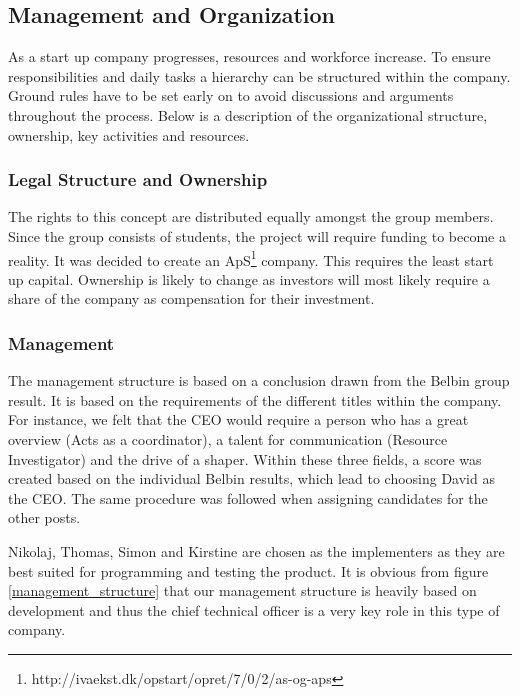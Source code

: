 \subsection{Management and Organization}
\label{sec:managementOrganization}
As a start up company progresses, resources and workforce increase. To ensure responsibilities and daily tasks a hierarchy can be structured within the company. Ground rules have to be set early on to avoid discussions and arguments throughout the process. Below is a description of the organizational structure, ownership, key activities and resources.

\subsubsection{Legal Structure and Ownership}
The rights to this concept are distributed equally amongst the group members. 
Since the group consists of students, the project will require funding to become a reality.  
It was decided to create an ApS\footnote{http://ivaekst.dk/opstart/opret/7/0/2/as-og-aps} company.
This requires the least start up capital. 
Ownership is likely to change as investors will most likely require a share of the company as compensation for their investment.

\subsubsection{Management}
The management structure is based on a conclusion drawn from the Belbin group result. It is based on the requirements of the different titles within the company. 
For instance, we felt that the CEO would require a person who has a great overview (Acts as a coordinator), a talent for communication (Resource Investigator) and the drive of a shaper. Within these three fields, a score was created based on the individual Belbin results, which lead to choosing David as the CEO. 
The same procedure was followed when assigning candidates for the other posts. 

Nikolaj, Thomas, Simon and Kirstine are chosen as the implementers as they are best suited for programming and testing the product.
It is obvious from figure \ref{management_structure} that our management structure is heavily based on development and thus the chief technical officer is a very key role in this type of company.

